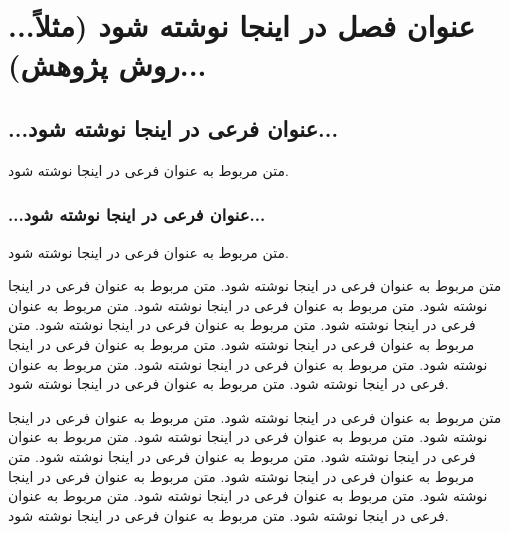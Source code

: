 \chapter{...عنوان فصل در اینجا نوشته شود  (مثلاً روش پژوهش)...}

\section{...عنوان فرعی در اینجا نوشته شود...}
متن مربوط به عنوان فرعی در اینجا نوشته شود.

\subsection{...عنوان فرعی در اینجا نوشته شود...}
متن مربوط به عنوان فرعی در اینجا نوشته شود.

\newpage
متن مربوط به عنوان فرعی در اینجا نوشته شود.
متن مربوط به عنوان فرعی در اینجا نوشته شود.
متن مربوط به عنوان فرعی در اینجا نوشته شود.
متن مربوط به عنوان فرعی در اینجا نوشته شود.
متن مربوط به عنوان فرعی در اینجا نوشته شود.
متن مربوط به عنوان فرعی در اینجا نوشته شود.
متن مربوط به عنوان فرعی در اینجا نوشته شود.
متن مربوط به عنوان فرعی در اینجا نوشته شود.
متن مربوط به عنوان فرعی در اینجا نوشته شود.
متن مربوط به عنوان فرعی در اینجا نوشته شود.

\newpage
متن مربوط به عنوان فرعی در اینجا نوشته شود.
متن مربوط به عنوان فرعی در اینجا نوشته شود.
متن مربوط به عنوان فرعی در اینجا نوشته شود.
متن مربوط به عنوان فرعی در اینجا نوشته شود.
متن مربوط به عنوان فرعی در اینجا نوشته شود.
متن مربوط به عنوان فرعی در اینجا نوشته شود.
متن مربوط به عنوان فرعی در اینجا نوشته شود.
متن مربوط به عنوان فرعی در اینجا نوشته شود.
متن مربوط به عنوان فرعی در اینجا نوشته شود.
متن مربوط به عنوان فرعی در اینجا نوشته شود.